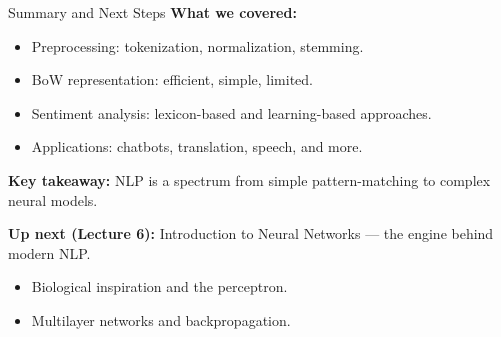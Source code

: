 \documentclass[10pt]{beamer}
\begin{document}
\begin{frame}{Summary and Next Steps}
    \textbf{What we covered:}
    \begin{itemize}
        \item Preprocessing: tokenization, normalization, stemming.
        \item BoW representation: efficient, simple, limited.
        \item Sentiment analysis: lexicon-based and learning-based approaches.
        \item Applications: chatbots, translation, speech, and more.
    \end{itemize}

    \vspace{0.2cm}
    \textbf{Key takeaway:} NLP is a spectrum from simple pattern-matching to complex neural models.

    \vspace{0.2cm}
    \textbf{Up next (Lecture 6):} Introduction to Neural Networks --- the engine behind modern NLP.
    \begin{itemize}
        \item Biological inspiration and the perceptron.
        \item Multilayer networks and backpropagation.
    \end{itemize}
\end{frame}
\end{document}
